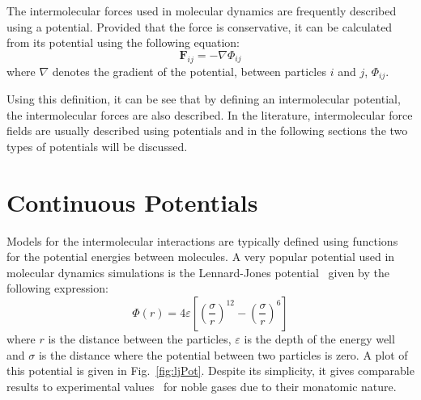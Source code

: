 \documentclass[12pt]{UoAthesis} \usepackage{booktabs}
\begin{document}
%

The intermolecular forces used in molecular dynamics are frequently
described using a potential.  Provided that the force is conservative,
it can be calculated from its potential using the following equation:
\begin{equation} 
  \mathbf{F}_{ij}=-\nabla \Phi_{ij}
  \label{eq:forcePotential} 
\end{equation}
%
%
where $\nabla$ denotes the gradient of the potential,
between particles $i$ and $j$, $\Phi_{ij}.$ 

Using this definition, it can be see that by defining an
intermolecular potential, the intermolecular forces are also
described.  In the literature, intermolecular force fields are usually
described using potentials and in the following sections the two types
of potentials will be discussed.

\section{Continuous Potentials}
Models for the intermolecular interactions are typically defined using
functions for the potential energies between molecules.  A very
popular potential used in molecular dynamics simulations is the
Lennard-Jones potential~\cite{Lennard-Jones1924} given by the
following expression:
\begin{equation} 
  \Phi(r) = 4 \varepsilon \left[ \left( \frac{\sigma}{r} \right)^{12}
    -\left( \frac{\sigma}{r} \right)^{6} \right] 
  \label{eq:LJ} 
\end{equation}
%
%
 where $r$ is the
distance between the particles, $\varepsilon$ is the depth of the
energy well and $\sigma$ is the distance where the potential between
two particles is zero. A plot of this potential is given in
Fig.~\ref{fig:ljPot}. Despite its simplicity, it gives comparable
results to experimental values~\cite{Rahman1964} for noble gases due
to their monatomic nature.
\end{document}
